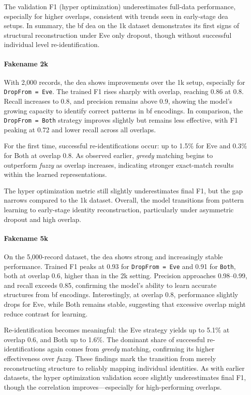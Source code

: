 The validation F1 (hyper optimization) underestimates full-data performance, especially for higher overlaps, consistent with trends seen in early-stage \ac{dea} setups.
In summary, the \ac{bf} \ac{dea} on the 1k dataset demonstrates its first signs of structural reconstruction under Eve only dropout, though without successful individual level re-identification.

\paragraph{Fakename 2k}

With 2{,}000 records, the \ac{dea} shows improvements over the 1k setup, especially for \texttt{DropFrom = Eve}.
The trained F1 rises sharply with overlap, reaching 0.86 at 0.8.
Recall increases to 0.8, and precision remains above 0.9, showing the model's growing capacity to identify correct patterns in \ac{bf} encodings.
In comparison, the \texttt{DropFrom = Both} strategy improves slightly but remains less effective, with F1 peaking at 0.72 and lower recall across all overlaps.

For the first time, successful re-identifications occur: up to 1.5\% for Eve and 0.3\% for Both at overlap 0.8.
As observed earlier, \emph{greedy} matching begins to outperform \emph{fuzzy} as overlap increases, indicating stronger exact-match results within the learned representations.

The hyper optimization metric still slightly underestimates final F1, but the gap narrows compared to the 1k dataset.
Overall, the model transitions from pattern learning to early-stage identity reconstruction, particularly under asymmetric dropout and high overlap.


\paragraph{Fakename 5k}

On the 5{,}000-record dataset, the \ac{dea} shows strong and increasingly stable performance.
Trained F1 peaks at 0.93 for \texttt{DropFrom = Eve} and 0.91 for \texttt{Both}, both at overlap 0.6, higher than in the 2k setting.
Precision approaches 0.98–0.99, and recall exceeds 0.85, confirming the model's ability to learn accurate structures from \ac{bf} encodings.
Interestingly, at overlap 0.8, performance slightly drops for Eve, while Both remains stable, suggesting that excessive overlap might reduce contrast for learning.

Re-identification becomes meaningful: the Eve strategy yields up to 5.1\% at overlap 0.6, and Both up to 1.6\%.
The dominant share of successful re-identifications again comes from \emph{greedy} matching, confirming its higher effectiveness over \emph{fuzzy}.
These findings mark the transition from merely reconstructing structure to reliably mapping individual identities.
As with earlier datasets, the hyper optimization validation score slightly underestimates final F1, though the correlation improves—especially for high-performing overlaps.

